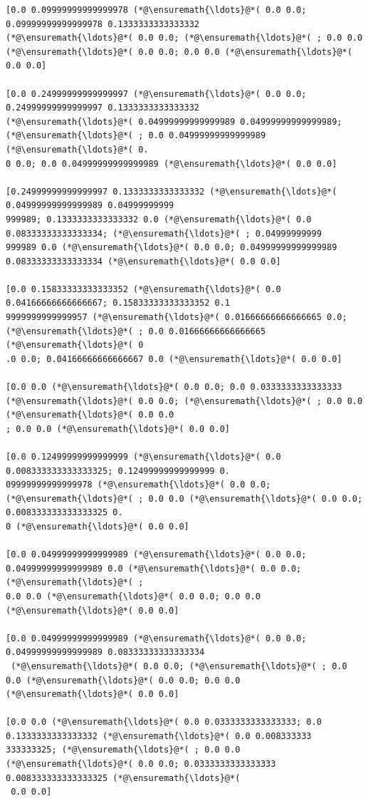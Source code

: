 \documentclass[12pt,a4paper]{article}
\begin{document}
\begin{lstlisting}
[0.0 0.09999999999999978 (*@\ensuremath{\ldots}@*( 0.0 0.0; 0.09999999999999978 0.1333333333333332 
(*@\ensuremath{\ldots}@*( 0.0 0.0; (*@\ensuremath{\ldots}@*( ; 0.0 0.0 (*@\ensuremath{\ldots}@*( 0.0 0.0; 0.0 0.0 (*@\ensuremath{\ldots}@*( 0.0 0.0]

[0.0 0.24999999999999997 (*@\ensuremath{\ldots}@*( 0.0 0.0; 0.24999999999999997 0.1333333333333332 
(*@\ensuremath{\ldots}@*( 0.04999999999999989 0.04999999999999989; (*@\ensuremath{\ldots}@*( ; 0.0 0.04999999999999989 (*@\ensuremath{\ldots}@*( 0.
0 0.0; 0.0 0.04999999999999989 (*@\ensuremath{\ldots}@*( 0.0 0.0]

[0.24999999999999997 0.1333333333333332 (*@\ensuremath{\ldots}@*( 0.04999999999999989 0.04999999999
999989; 0.1333333333333332 0.0 (*@\ensuremath{\ldots}@*( 0.0 0.08333333333333334; (*@\ensuremath{\ldots}@*( ; 0.04999999999
999989 0.0 (*@\ensuremath{\ldots}@*( 0.0 0.0; 0.04999999999999989 0.08333333333333334 (*@\ensuremath{\ldots}@*( 0.0 0.0]

[0.0 0.15833333333333352 (*@\ensuremath{\ldots}@*( 0.0 0.04166666666666667; 0.15833333333333352 0.1
9999999999999957 (*@\ensuremath{\ldots}@*( 0.01666666666666665 0.0; (*@\ensuremath{\ldots}@*( ; 0.0 0.01666666666666665 (*@\ensuremath{\ldots}@*( 0
.0 0.0; 0.04166666666666667 0.0 (*@\ensuremath{\ldots}@*( 0.0 0.0]

[0.0 0.0 (*@\ensuremath{\ldots}@*( 0.0 0.0; 0.0 0.0333333333333333 (*@\ensuremath{\ldots}@*( 0.0 0.0; (*@\ensuremath{\ldots}@*( ; 0.0 0.0 (*@\ensuremath{\ldots}@*( 0.0 0.0
; 0.0 0.0 (*@\ensuremath{\ldots}@*( 0.0 0.0]

[0.0 0.12499999999999999 (*@\ensuremath{\ldots}@*( 0.0 0.008333333333333325; 0.12499999999999999 0.
09999999999999978 (*@\ensuremath{\ldots}@*( 0.0 0.0; (*@\ensuremath{\ldots}@*( ; 0.0 0.0 (*@\ensuremath{\ldots}@*( 0.0 0.0; 0.008333333333333325 0.
0 (*@\ensuremath{\ldots}@*( 0.0 0.0]

[0.0 0.04999999999999989 (*@\ensuremath{\ldots}@*( 0.0 0.0; 0.04999999999999989 0.0 (*@\ensuremath{\ldots}@*( 0.0 0.0; (*@\ensuremath{\ldots}@*( ; 
0.0 0.0 (*@\ensuremath{\ldots}@*( 0.0 0.0; 0.0 0.0 (*@\ensuremath{\ldots}@*( 0.0 0.0]

[0.0 0.04999999999999989 (*@\ensuremath{\ldots}@*( 0.0 0.0; 0.04999999999999989 0.08333333333333334
 (*@\ensuremath{\ldots}@*( 0.0 0.0; (*@\ensuremath{\ldots}@*( ; 0.0 0.0 (*@\ensuremath{\ldots}@*( 0.0 0.0; 0.0 0.0 (*@\ensuremath{\ldots}@*( 0.0 0.0]

[0.0 0.0 (*@\ensuremath{\ldots}@*( 0.0 0.0333333333333333; 0.0 0.1333333333333332 (*@\ensuremath{\ldots}@*( 0.0 0.008333333
333333325; (*@\ensuremath{\ldots}@*( ; 0.0 0.0 (*@\ensuremath{\ldots}@*( 0.0 0.0; 0.0333333333333333 0.008333333333333325 (*@\ensuremath{\ldots}@*(
 0.0 0.0]


\end{lstlisting}
\end{document}

